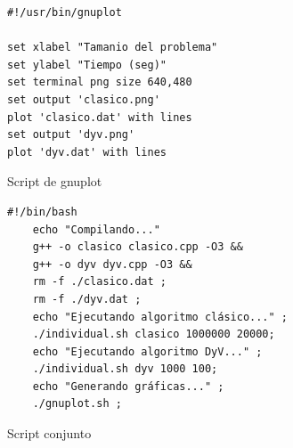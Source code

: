 \documentclass[12pt,spanish]{article}
\begin{document}
\begin{figure}[H]
\begin{verbatim}
#!/usr/bin/gnuplot

set xlabel "Tamanio del problema"
set ylabel "Tiempo (seg)"
set terminal png size 640,480
set output 'clasico.png'
plot 'clasico.dat' with lines
set output 'dyv.png'
plot 'dyv.dat' with lines
\end{verbatim}
\caption{Script de gnuplot}
\end{figure}


\begin{figure}[H]
\begin{verbatim}
#!/bin/bash
	echo "Compilando..."
	g++ -o clasico clasico.cpp -O3 &&
	g++ -o dyv dyv.cpp -O3 &&
	rm -f ./clasico.dat ;
	rm -f ./dyv.dat ;
	echo "Ejecutando algoritmo clásico..." ;
	./individual.sh clasico 1000000 20000;
	echo "Ejecutando algoritmo DyV..." ;
	./individual.sh dyv 1000 100;
	echo "Generando gráficas..." ;
	./gnuplot.sh ;
\end{verbatim}
\caption{Script conjunto}
\end{figure}


\end{document}
